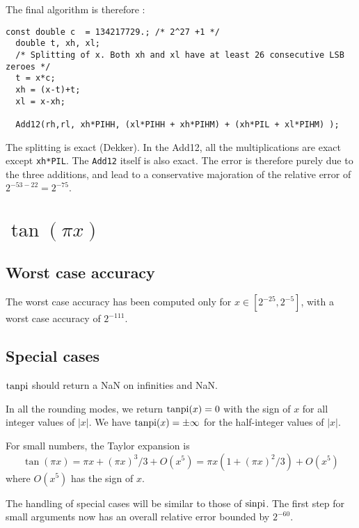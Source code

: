 The final algorithm is therefore :
\begin{lstlisting}[caption={Multiplication by $\pi$ \label{lst:trigpi:pix}},firstnumber=1]
  const double c  = 134217729.; /* 2^27 +1 */   
  double t, xh, xl;                           
  /* Splitting of x. Both xh and xl have at least 26 consecutive LSB zeroes */
  t = x*c;     
  xh = (x-t)+t;
  xl = x-xh;   

  Add12(rh,rl, xh*PIHH, (xl*PIHH + xh*PIHM) + (xh*PIL + xl*PIHM) );               
\end{lstlisting}

The splitting is exact (Dekker). In the Add12, all the multiplications
are exact except \texttt{xh*PIL}. The \texttt{Add12} itself is also
exact. The error is therefore purely due to the three additions, and
lead to a conservative majoration of the relative error of $2^{-53-22}
= 2^{-75}$. 



\section{$\tan(\pi x)$}

\subsection{Worst case accuracy}

The worst case accuracy has been computed only for $x \in [2^{-25},
2^{-5}]$, with a worst case accuracy of $2^{-111}$. 

\subsection{Special cases}


$\operatorname{tanpi}$ should return a NaN on infinities and NaN.

In all the rounding modes, we return $\operatorname{tanpi}(x)=0$ with the sign of $x$ for all
integer values of $|x|$. We have $\operatorname{tanpi}(x)=\pm \infty$ for  the half-integer
values of $|x|$. 

For small numbers, the Taylor expansion is
\begin{equation}
  \tan(\pi x) = \pi x + (\pi x)^3/3 + O(x^5) 
  = \pi x(1+(\pi x)^2/3) + O(x^5)\label{eq:tanpiTaylor}
\end{equation}
where $O(x^5)$ has the sign of $x$. 

The handling of special cases will be similar to those of $\operatorname{sinpi}$. The
first step for small arguments now has an overall relative error
bounded by $2^{-60}$.
 

